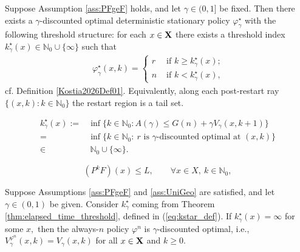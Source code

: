 \documentclass[10pt,a4paper]{amsart}
\begin{document}
\begin{theorem}
\label{thm:elapsed_time_threshold}
Suppose {Assumption \ref{ass:PFgeF} holds}, {and let $\gamma\in(0,1]$ be fixed.}
Then there exists a {$\gamma$-discounted} optimal deterministic stationary policy {$\varphi_\gamma^\star$} 
with the following {threshold} structure:
for each $x\in {\bf X}$ there exists a threshold index ${k^\star_\gamma}(x)\in \mathbb N_0\cup\{\infty\}$ 
such that { \begin{align}\label{Kostia2026Eqn08}
\varphi^\star_\gamma(x,k)=\begin{cases}
r & \mbox{ if $k\ge k^{\star}_\gamma(x)$;}\\
n & \mbox{ if $k<k^{\star}_\gamma(x)$,} 
\end{cases}
\end{align}
cf. Definition \ref{Kostia2026Def01}.} 
Equivalently, along each post-restart ray $\{(x,k):k\in\mathbb N_0\}$ the restart region is a tail set.
\end{theorem}

\begin{align}\label{eq:kstar_def}
{k^\star_\gamma(x)}:= & \inf\{k\in\mathbb N_0: {A(\gamma)\le G(n)+\gamma V_\gamma(x,k+1)}\}\nonumber\\
= & \inf\{k\in\mathbb N_0:\ \text{$r$ is {$\gamma$-discounted} optimal at } (x,k)\}\nonumber\\ 
\in & \ \mathbb N_0\cup\{\infty\}.
\end{align}

\begin{equation}\label{eq:PkF_le_L}
(P^kF)(x)\le L,\qquad \forall x\in X,\ k\in\mathbb N_0,
\end{equation}

\begin{lemma}\label{Kostia2026Lem01}
Suppose Assumptions \ref{ass:PFgeF} and \ref{ass:UniGeo} are satisfied, and let $\gamma\in (0,1)$ be given. Consider $k_\gamma^\star$ coming from Theorem \ref{thm:elapsed_time_threshold}, defined in (\ref{eq:kstar_def}).  If $k^\star_\gamma(x)=\infty$ for some $x,$ then the always-$n$ policy $\varphi^n$ is $\gamma$-discounted optimal, i.e., $V_\gamma^{\varphi^n}(x,k)=V_\gamma(x,k)$ for all $x\in {\bf X}$ and $k\ge 0.$
\end{lemma}
\end{document}
